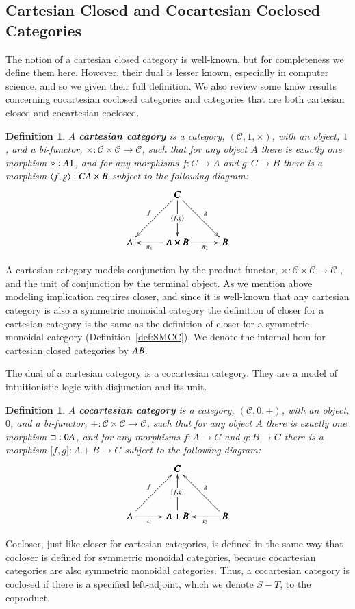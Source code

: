 \documentclass{lmcs}
\newtheorem{definition}[theorem]{Definition}
\let\mto\to
\let\to\relax
\newcommand{\to}{\rightarrow}
\newcommand{\cat}[1]{\mathcal{#1}}
\begin{document}
\subsection{Cartesian Closed and Cocartesian Coclosed Categories}
\label{subsec:cartesian_closed_and_cocartesian_coclosed_categories}
The notion of a cartesian closed category is well-known, but for
completeness we define them here.  However, their dual is lesser
known, especially in computer science, and so we given their full
definition.  We also review some know results concerning cocartesian
coclosed categories and categories that are both cartesian closed and
cocartesian coclosed.
\begin{definition}
  \label{def:CC}
  A \textbf{cartesian category} is a category, $(\cat{C}, 1, \times)$,
  with an object, $1$, and a bi-functor, $\times : \cat{C} \times
  \cat{C} \mto \cat{C}$, such that for any object $A$ there is exactly
  one morphism $\diamond : A \to 1$, and for any morphisms $f : C \mto
  A$ and $g : C \mto B$ there is a morphism $\langle f , g \rangle : C
  \to A \times B$ subject to the following diagram:
  \[
  \bfig
  \Atrianglepair/->`->`->`<-`->/[C`A`A\times B`B;
    f`
    \langle f , g \rangle`
    g`
    \pi_1`
    \pi_2]
  \efig
  \]
\end{definition}
A cartesian category models conjunction by the product functor,
$\times : \cat{C} \times \cat{C} \mto \cat{C}$ , and the unit of
conjunction by the terminal object.  As we mention above modeling
implication requires closer, and since it is well-known that any
cartesian category is also a symmetric monoidal category the
definition of closer for a cartesian category is the same as the
definition of closer for a symmetric monoidal category
(Definition~\ref{def:SMCC}).  We denote the internal hom for cartesian
closed categories by $A \to B$.

The dual of a cartesian category is a cocartesian category.  They are
a model of intuitionistic logic with disjunction and its unit.
\begin{definition}
  \label{def:CC}
  A \textbf{cocartesian category} is a category, $(\cat{C}, 0, +)$,
  with an object, $0$, and a bi-functor,
  $+ : \cat{C} \times \cat{C} \mto \cat{C}$, such that for any object $A$ there is exactly
  one morphism $\Box : 0 \to A$, and for any morphisms $f : A \mto C$ and $g : B \mto C$
  there is a morphism $\lbrack f , g \rbrack : A + B \mto C$
  subject to the following diagram:
  \[
  \bfig
  \Atrianglepair/<-`<-`<-`->`<-/[C`A`A+B`B;
    f`
    \lbrack f, g \rbrack`
    g`
    \iota_1`
    \iota_2]
  \efig
  \]  
\end{definition}
Cocloser, just like closer for cartesian categories, is defined in
the same way that cocloser is defined for symmetric monoidal
categories, because cocartesian categories are also symmetric
monoidal categories.  Thus, a cocartesian category is coclosed if
there is a specified left-adjoint, which we denote $S - T$, to the
coproduct.
\end{document}
